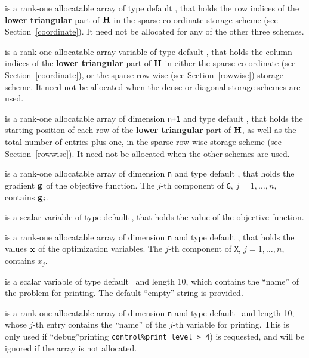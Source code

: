 \documentclass{galahad}
\begin{document}
\begin{description}
\begin{description}
 is a rank-one allocatable array of type default \integer,
that holds the row indices of the {\bf lower triangular} part of ${\mathbf{H}}$
in the sparse co-ordinate storage
scheme (see Section~\ref{coordinate}).
It need not be allocated for any of the other three schemes.

 is a rank-one allocatable array variable of type default \integer,
that holds the column indices of the {\bf lower triangular} part of
${\mathbf{H}}$ in either the sparse co-ordinate
(see Section~\ref{coordinate}), or the sparse row-wise
(see Section~\ref{rowwise}) storage scheme.
It need not be allocated when the dense or diagonal storage schemes are used.

 is a rank-one allocatable array of dimension {\tt n+1} and type
default \integer, that holds the starting position of
each row of the {\bf lower triangular} part of ${\mathbf{H}}$, as well
as the total number of entries plus one, in the sparse row-wise storage
scheme (see Section~\ref{rowwise}). It need not be allocated when the
other schemes are used.

\end{description}

 is a rank-one allocatable array of dimension {\tt n} and type
default \realdp, that holds the gradient ${\mathbf{g}}$
of the objective function.
The $j$-th component of
{\tt G}, $j = 1,  \ldots ,  n$, contains ${\mathbf{g}}_{j}$.

 is a scalar variable of type
default \realdp, that holds the value of the objective function.

 is a rank-one allocatable array of dimension {\tt n} and type
default \realdp,
that holds the values ${\mathbf{x}}$ of the optimization variables.
The $j$-th component of {\tt X}, $j = 1,  \ldots , n$, contains $x_{j}$.

 is a scalar variable of type
default \character\ and length 10, which contains the
``name'' of the problem for printing. The default ``empty'' string is
provided.

 is a rank-one allocatable array of dimension {\tt n} and type
default \character\ and length 10, whose $j$-th entry contains the
``name'' of the $j$-th variable for printing. This is only used
if ``debug''printing {\tt control\%print\_level > 4}) is requested,
and will be ignored if the array is not allocated.

\end{description}

\end{document}
